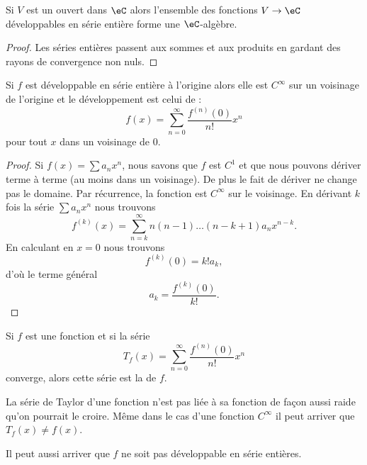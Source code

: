 \begin{proposition}
    Si \( V\) est un ouvert dans \( \eC\) alors l'ensemble des fonctions \( V\to \eC\) développables en série entière forme une \( \eC\)-algèbre.
\end{proposition}

\begin{proof}
    Les séries entières passent aux sommes et aux produits en gardant des rayons de convergence non nuls.
\end{proof}

\begin{proposition}
    Si \( f\) est développable en série entière à l'origine alors elle est \( C^{\infty}\) sur un voisinage de l'origine et le développement est celui de  :
    \begin{equation}
        f(x)=\sum_{n=0}^{\infty}\frac{ f^{(n)}(0) }{ n! }x^n
    \end{equation}
    pour tout \( x\) dans un voisinage de \( 0\).
\end{proposition}

\begin{proof}
    Si \( f(x)=\sum a_nx^n\), nous savons que \( f\) est \( C^1\) et que nous pouvons dériver terme à terme (au moins dans un voisinage). De plus le fait de dériver ne change pas le domaine. Par récurrence, la fonction est \( C^{\infty}\) sur le voisinage. En dérivant \( k\) fois la série \( \sum a_nx^n\) nous trouvons
    \begin{equation}
        f^{(k)}(x)=\sum_{n=k}^{\infty}n(n-1)\ldots (n-k+1)a_nx^{n-k}.
    \end{equation}
    En calculant en \( x=0\) nous trouvons
    \begin{equation}
        f^{(k)}(0)=k! a_k,
    \end{equation}
    d'où le terme général
    \begin{equation}
        a_k=\frac{ f^{(k)}(0) }{ k! }.
    \end{equation}
\end{proof}

Si \( f\) est une fonction et si la série
\begin{equation}
    T_f(x)=\sum_{n=0}^{\infty}\frac{ f^{(n)}(0) }{ n! }x^n
\end{equation}
converge, alors cette série est la  de \( f\).

\begin{remark}
    La série de Taylor d'une fonction n'est pas liée à sa fonction de façon aussi raide qu'on pourrait le croire. Même dans le cas d'une fonction \( C^{\infty}\) il peut arriver que \( T_f(x)\neq f(x)\).
    
    Il peut aussi arriver que \( f\) ne soit pas développable en série entières.
\end{remark}

